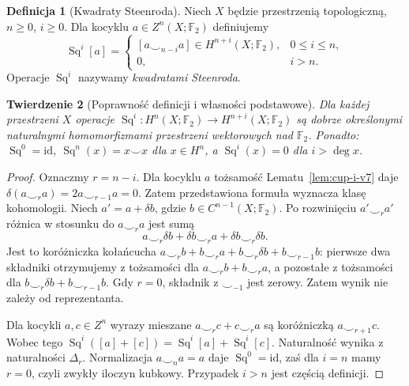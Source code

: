 \documentclass[11pt,a4paper,oneside]{report}
\newcommand{\F}{\mathbb{F}}
\newcommand{\id}{\mathrm{id}}
\theoremstyle{plain}
\newtheorem{twierdzenie}{Twierdzenie}[section]
\theoremstyle{definition}
\newtheorem{definicja}[twierdzenie]{Definicja}
\theoremstyle{remark}
\begin{document}
\begin{definicja}[Kwadraty Steenroda]
Niech $X$ będzie przestrzenią topologiczną,
$n\ge0$, $i\ge0$. Dla kocyklu
$a\in Z^n(X;\F_2)$ definiujemy
\[
\operatorname{Sq}^i[a]=
\begin{cases}
[a\smile_{n-i}a]\in H^{n+i}(X;\F_2),&0\le i\le n,\\
0,&i>n.
\end{cases}
\]
Operacje $\operatorname{Sq}^i$ nazywamy
\emph{kwadratami Steenroda}.
\end{definicja}

\begin{twierdzenie}[Poprawność definicji i własności podstawowe]
\label{thm:steenrod-basic-v7}
Dla każdej przestrzeni $X$ operacje
$\operatorname{Sq}^i:H^n(X;\F_2)\to H^{n+i}(X;\F_2)$
są dobrze określonymi naturalnymi homomorfizmami
przestrzeni wektorowych nad $\F_2$. Ponadto:
$\operatorname{Sq}^0=\id$,
$\operatorname{Sq}^n(x)=x\smile x$ dla $x\in H^n$,
a $\operatorname{Sq}^i(x)=0$ dla $i>\deg x$.
\end{twierdzenie}
\begin{proof}
Oznaczmy $r=n-i$. Dla kocyklu $a$ tożsamość
Lematu~\ref{lem:cup-i-v7} daje
$\delta(a\smile_r a)=2a\smile_{r-1}a=0$.
Zatem przedstawiona formuła wyznacza klasę
kohomologii. Niech $a'=a+\delta b$, gdzie
$b\in C^{n-1}(X;\F_2)$. Po rozwinięciu
$a'\smile_r a'$ różnica w stosunku do
$a\smile_r a$ jest sumą
\[
a\smile_r\delta b+\delta b\smile_r a
+\delta b\smile_r\delta b.
\]
Jest to koróżniczka kołańcucha
\(a\smile_r b+b\smile_r a
+b\smile_r\delta b+b\smile_{r-1}b\):
pierwsze dwa składniki otrzymujemy z tożsamości
dla $a\smile_r b+b\smile_r a$,
a pozostałe z tożsamości dla
$b\smile_r\delta b+b\smile_{r-1}b$.
Gdy $r=0$, składnik z $\smile_{-1}$ jest zerowy.
Zatem wynik nie zależy od reprezentanta.

Dla kocykli $a,c\in Z^n$ wyrazy mieszane
$a\smile_r c+c\smile_r a$ są koróżniczką
$a\smile_{r+1}c$. Wobec tego
$\operatorname{Sq}^i([a]+[c])=
\operatorname{Sq}^i[a]+\operatorname{Sq}^i[c]$.
Naturalność wynika z naturalności $\Delta_r$.
Normalizacja $a\smile_n a=a$ daje
$\operatorname{Sq}^0=\id$, zaś dla $i=n$
mamy $r=0$, czyli zwykły iloczyn kubkowy.
Przypadek $i>n$ jest częścią definicji.
\end{proof}
\end{document}
